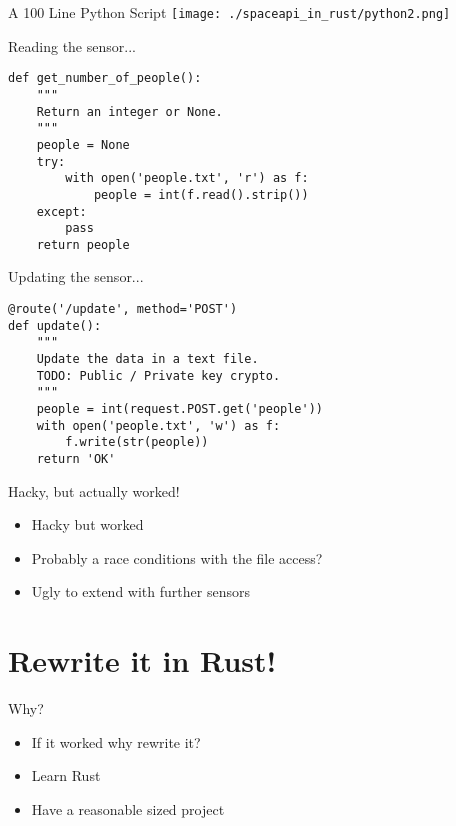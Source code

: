 \begin{frame}[c]{A 100 Line Python Script}
    \centering
    \texttt{[image: ./spaceapi\_in\_rust/python2.png]}
\end{frame}

\begin{frame}[fragile]{Reading the sensor...}
    \begin{verbatim}
def get_number_of_people():
    """
    Return an integer or None.
    """
    people = None
    try:
        with open('people.txt', 'r') as f:
            people = int(f.read().strip())
    except:
        pass
    return people
    \end{verbatim}
\end{frame}

\begin{frame}[fragile]{Updating the sensor...}
    \begin{verbatim}
@route('/update', method='POST')
def update():
    """
    Update the data in a text file.
    TODO: Public / Private key crypto.
    """
    people = int(request.POST.get('people'))
    with open('people.txt', 'w') as f:
        f.write(str(people))
    return 'OK'
    \end{verbatim}
\end{frame}

\begin{frame}[c]{Hacky, but actually worked!}
    \begin{itemize}
        \item Hacky but worked
        \item Probably a race conditions with the file access?
        \item Ugly to extend with further sensors
    \end{itemize}
\end{frame}

\section{Rewrite it in Rust!}

\begin{frame}[c]{Why?}
    \begin{itemize}
        \item If it worked why rewrite it?
        \pause\item Learn Rust
        \item Have a reasonable sized project
    \end{itemize}
\end{frame}


